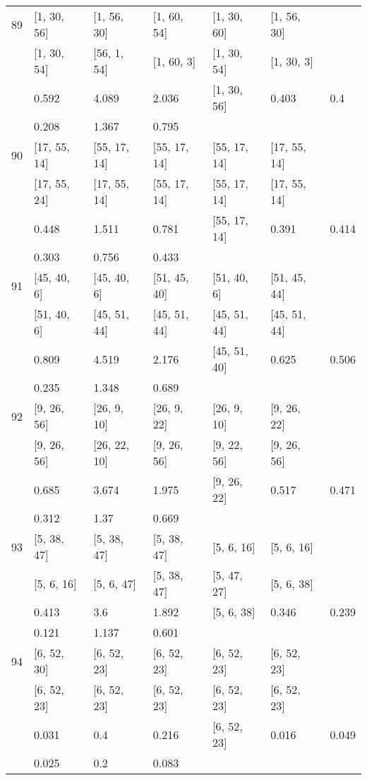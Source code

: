 \begin{longtable}{| l || l | l | l | l | l | l | }
\hline
89  & [1, 30, 56] & [1, 56, 30] & [1, 60, 54] & [1, 30, 60] & [1, 56, 30] \\
 & [1, 30, 54] & [56, 1, 54] & [1, 60, 3] & [1, 30, 54] & [1, 30, 3]\\
\hline
& 0.592 & 4.089 & 2.036 & [1, 30, 56] & 0.403 & 0.4\\
\hline
& 0.208 & 1.367 & 0.795 \\
\hline

\hline
90  & [17, 55, 14] & [55, 17, 14] & [55, 17, 14] & [55, 17, 14] & [17, 55, 14] \\
 & [17, 55, 24] & [17, 55, 14] & [55, 17, 14] & [55, 17, 14] & [17, 55, 14]\\
\hline
& 0.448 & 1.511 & 0.781 & [55, 17, 14] & 0.391 & 0.414\\
\hline
& 0.303 & 0.756 & 0.433 \\
\hline

\hline
91  & [45, 40, 6] & [45, 40, 6] & [51, 45, 40] & [51, 40, 6] & [51, 45, 44] \\
 & [51, 40, 6] & [45, 51, 44] & [45, 51, 44] & [45, 51, 44] & [45, 51, 44]\\
\hline
& 0.809 & 4.519 & 2.176 & [45, 51, 40] & 0.625 & 0.506\\
\hline
& 0.235 & 1.348 & 0.689 \\
\hline

\hline
92  & [9, 26, 56] & [26, 9, 10] & [26, 9, 22] & [26, 9, 10] & [9, 26, 22] \\
 & [9, 26, 56] & [26, 22, 10] & [9, 26, 56] & [9, 22, 56] & [9, 26, 56]\\
\hline
& 0.685 & 3.674 & 1.975 & [9, 26, 22] & 0.517 & 0.471\\
\hline
& 0.312 & 1.37 & 0.669 \\
\hline

\hline
93  & [5, 38, 47] & [5, 38, 47] & [5, 38, 47] & [5, 6, 16] & [5, 6, 16] \\
 & [5, 6, 16] & [5, 6, 47] & [5, 38, 47] & [5, 47, 27] & [5, 6, 38]\\
\hline
& 0.413 & 3.6 & 1.892 & [5, 6, 38] & 0.346 & 0.239\\
\hline
& 0.121 & 1.137 & 0.601 \\
\hline

\hline
94  & [6, 52, 30] & [6, 52, 23] & [6, 52, 23] & [6, 52, 23] & [6, 52, 23] \\
 & [6, 52, 23] & [6, 52, 23] & [6, 52, 23] & [6, 52, 23] & [6, 52, 23]\\
\hline
& 0.031 & 0.4 & 0.216 & [6, 52, 23] & 0.016 & 0.049\\
\hline
& 0.025 & 0.2 & 0.083 \\
\hline


\end{longtable}
